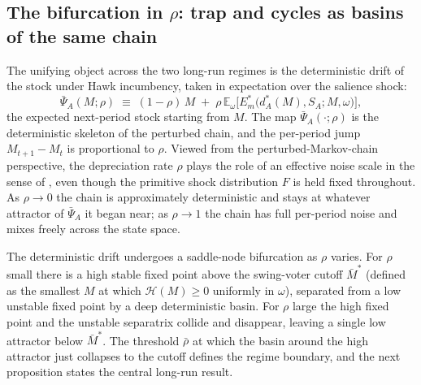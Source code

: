 \documentclass[11pt,twoside]{extarticle}
\begin{document}
\subsection{The bifurcation in $\rho$: trap and cycles as basins of the same chain}\label{subsec:bifurcation_v3}

The unifying object across the two long-run regimes is the deterministic drift of the stock under Hawk incumbency, taken in expectation over the salience shock:
\begin{equation}\label{eq:drift_v3}
    \bar\Psi_A(M;\rho)\;\equiv\;(1-\rho)\,M\;+\;\rho\,\mathbb{E}_\omega\big[E_m^*\big(d_A^*(M),S_A;M,\omega\big)\big],
\end{equation}
the expected next-period stock starting from $M$. The map $\bar\Psi_A(\cdot;\rho)$ is the deterministic skeleton of the perturbed chain, and the per-period jump $M_{t+1}-M_t$ is proportional to $\rho$. Viewed from the perturbed-Markov-chain perspective, the depreciation rate $\rho$ plays the role of an effective noise scale in the sense of \citet{youngEvolutionConventions1993}, even though the primitive shock distribution $F$ is held fixed throughout. As $\rho\to 0$ the chain is approximately deterministic and stays at whatever attractor of $\bar\Psi_A$ it began near; as $\rho\to 1$ the chain has full per-period noise and mixes freely across the state space.

The deterministic drift undergoes a saddle-node bifurcation as $\rho$ varies. For $\rho$ small there is a high stable fixed point above the swing-voter cutoff $\bar M^*$ (defined as the smallest $M$ at which $\mathcal H(M)\ge 0$ uniformly in $\omega$), separated from a low unstable fixed point by a deep deterministic basin. For $\rho$ large the high fixed point and the unstable separatrix collide and disappear, leaving a single low attractor below $\bar M^*$. The threshold $\bar\rho$ at which the basin around the high attractor just collapses to the cutoff defines the regime boundary, and the next proposition states the central long-run result.
\end{document}
